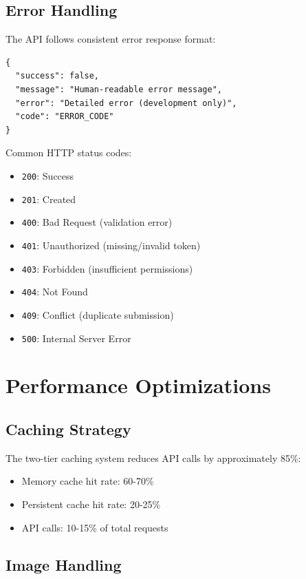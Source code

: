 \documentclass[12pt,a4paper]{article}
\begin{document}
\subsection{Error Handling}

The API follows consistent error response format:

\begin{verbatim}
{
  "success": false,
  "message": "Human-readable error message",
  "error": "Detailed error (development only)",
  "code": "ERROR_CODE"
}
\end{verbatim}

Common HTTP status codes:
\begin{itemize}
    \item \texttt{200}: Success
    \item \texttt{201}: Created
    \item \texttt{400}: Bad Request (validation error)
    \item \texttt{401}: Unauthorized (missing/invalid token)
    \item \texttt{403}: Forbidden (insufficient permissions)
    \item \texttt{404}: Not Found
    \item \texttt{409}: Conflict (duplicate submission)
    \item \texttt{500}: Internal Server Error
\end{itemize}

\section{Performance Optimizations}

\subsection{Caching Strategy}

The two-tier caching system reduces API calls by approximately 85\%:
\begin{itemize}
    \item Memory cache hit rate: 60-70\%
    \item Persistent cache hit rate: 20-25\%
    \item API calls: 10-15\% of total requests
\end{itemize}

\subsection{Image Handling}
\end{document}
